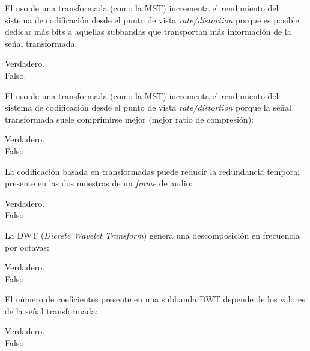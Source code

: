 \documentclass[legalpaper, 12pt, addpoints]{exam}
\begin{document}
\begin{questions}
\vspace{0.10in}

\question El uso de una transformada (como la MST) incrementa el
rendimiento del sistema de codificación desde el punto de vista
\emph{rate/distortion} porque es posible dedicar más bits a aquellas
subbandas que transportan más información de la señal transformada:

\begin{oneparchoices}
  \choice Verdadero.\\
  \choice Falso.
\end{oneparchoices}
  
\vspace{0.10in}

\question El uso de una transformada (como la MST) incrementa el
rendimiento del sistema de codificación desde el punto de vista
\emph{rate/distortion} porque la señal transformada suele comprimirse
mejor (mejor ratio de compresión):

\begin{oneparchoices}
  \choice Verdadero.\\
  \choice Falso.
\end{oneparchoices}
  
\vspace{0.10in}

\question La codificación basada en transformadas puede reducir la
redundancia temporal presente en las dos muestras de un \emph{frame}
de audio:

\begin{oneparchoices}
  \choice Verdadero.\\
  \choice Falso.
\end{oneparchoices}
  
\vspace{0.10in}

\question La DWT (\emph{Dicrete Wavelet Transform}) genera una descomposición
en frecuencia por octavas:

\begin{oneparchoices}
  \choice Verdadero.\\
  \choice Falso.
\end{oneparchoices}
  
\vspace{0.10in}

\question El número de coeficientes presente en una subbanda DWT
depende de los valores de la señal transformada:

\begin{oneparchoices}
  \choice Verdadero.\\
  \choice Falso.
\end{oneparchoices}
  

\end{questions}
\end{document}
